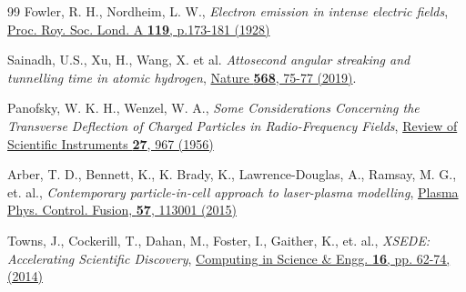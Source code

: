 \documentclass[aps,twocolumn,notitlepage,superscriptaddress]{revtex4-1}
\begin{document}
\begin{thebibliography}{99}
Fowler, R. H., Nordheim, L. W.,
	\textit{Electron emission in intense electric fields},
	\href{https://doi.org/10.1098/rspa.1928.0091}{Proc. Roy. Soc. Lond. A {\bf 119}, p.173-181 (1928)}
	
Sainadh, U.S., Xu, H., Wang, X. et al. 
	\textit{Attosecond angular streaking and tunnelling time in atomic hydrogen},
	\href{https://doi.org/10.1038/s41586-019-1028-3}{Nature {\bf 568}, 75-77 (2019)}.
	
Panofsky, W. K. H., Wenzel, W. A.,
	\textit{Some Considerations Concerning the Transverse Deflection of Charged Particles in Radio-Frequency Fields},
	\href{https://doi.org/10.1063/1.1715427}{Review of Scientific Instruments {\bf 27}, 967 (1956)}
	
Arber, T. D., Bennett, K., K. Brady, K., Lawrence-Douglas,  A., Ramsay, M. G., et. al.,
	\textit{Contemporary particle-in-cell approach to laser-plasma modelling},
	\href{https://doi.org/10.1088/0741-3335/57/11/113001}{Plasma Phys. Control. Fusion, {\bf 57}, 113001 (2015)}
	
Towns, J., Cockerill, T., Dahan, M., Foster, I., Gaither, K., et. al.,
	\textit{XSEDE: Accelerating Scientific Discovery},
	\href{https://doi.org/10.1109/MCSE.2014.80}{Computing in Science \& Engg. {\bf 16}, pp. 62-74, (2014)}
	
\end{thebibliography}
\end{document}

